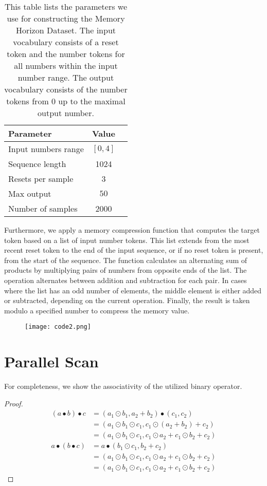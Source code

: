 \documentclass{article} \usepackage{iclr2024_conference,times}
\begin{document}
\begin{table}[H]
    \caption{This table lists the parameters we use for constructing the Memory Horizon Dataset. The input vocabulary consists of a reset token and the number tokens for all numbers within the input number range. The output vocabulary consists of the number tokens from 0 up to the maximal output number.}
    \centering
    \begin{tabular}{lcc}
        \toprule
        Parameter & Value \\
        \midrule
        Input numbers range & $[0, 4]$ \\
        Sequence length & 1024 \\
        Resets per sample & 3 \\
        Max output & $50$ \\
        Number of samples & 2000 \\
        \bottomrule
    \end{tabular}
    \label{table:general_hparams}
\end{table}

Furthermore, we apply a memory compression function that computes the target token based on a list of input number tokens. This list extends from the most recent reset token to the end of the input sequence, or if no reset token is present, from the start of the sequence. The function calculates an alternating sum of products by multiplying pairs of numbers from opposite ends of the list. The operation alternates between addition and subtraction for each pair. In cases where the list has an odd number of elements, the middle element is either added or subtracted, depending on the current operation. Finally, the result is taken modulo a specified number to compress the memory value.




\begin{figure}[H]
    \centering
    \texttt{[image: code2.png]}
\end{figure}

\section{Parallel Scan}\label{sec:parallel_scan_details}

For completeness, we show the associativity of the utilized binary operator. 

\begin{proof}
\begin{align*}
(a \bullet b) \bullet c &= (a_1 \odot b_1, a_2 + b_2) \bullet (c_1, c_2) \\
&= (a_1 \odot b_1 \odot c_1, c_1 \odot (a_2 + b_2) + c_2) \\
&= (a_1 \odot b_1 \odot c_1, c_1 \odot a_2 + c_1 \odot b_2 + c_2) \\
a \bullet (b \bullet c) &= a \bullet (b_1 \odot c_1, b_2 + c_2) \\
&= (a_1 \odot b_1 \odot c_1, c_1 \odot a_2 + c_1 \odot b_2 + c_2) \\
&= (a_1 \odot b_1 \odot c_1, c_1 \odot a_2 + c_1 \odot b_2 + c_2)
\end{align*}
\end{proof}
\end{document}
